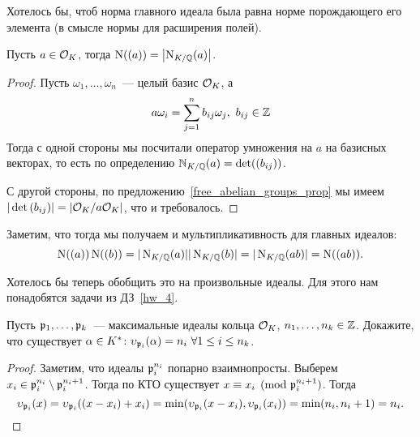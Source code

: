 	Хотелось бы, чтоб норма главного идеала была равна норме порождающего его элемента (в смысле нормы для расширения полей). 
	\begin{statement} 
		 Пусть $a \in \mathcal{O}_{K}$, тогда $\mathrm{N}((a)) = \left\lvert\mathrm{N}_{K/\mathbb{Q}}(a)\right\rvert$.
	\end{statement}
	\begin{proof}
		Пусть $\omega_{1}, \ldots, \omega_{n}$~--- целый базис $\mathcal{O}_{K}$, а 
		\[
			a \omega_{i} = \sum\limits_{j = 1}^{n} b_{i j} \omega_{j}, \ b_{i j} \in \mathbb{Z}	
		\]
		Тогда с одной стороны мы посчитали оператор умножения на $a$ на базисных векторах, то есть по определению $\mathbb{N}_{K/\mathbb{Q}}(a) = \det((b_{i j}))$. 

		 С другой стороны, по предложению~\ref{free_abelian_groups_prop} мы имеем $|\det{(b_{i j})}| = \left\lvert \mathcal{O}_{K}/a\mathcal{O}_{K} \right\rvert$, что и требовалось. 
	\end{proof}

	Заметим, что тогда мы получаем и мультипликативность для главных идеалов: 
	\[
		\operatorname{\mathrm{N}}((a))\operatorname{\mathrm{N}}((b)) = |\operatorname{\mathrm{N}}_{K/\mathbb{Q}}(a)||\operatorname{\mathrm{N}}_{K/\mathbb{Q}}(b)| = |\operatorname{\mathrm{N}}_{K/\mathbb{Q}}(ab)| = \operatorname{\mathrm{N}}((ab)).
	\]

	Хотелось бы теперь обобщить это на произвольные идеалы. Для этого нам понадобятся задачи из ДЗ~\ref{hw_4}. 

	\begin{lemma}\label{hw_4_task_3} 
		 Пусть $\mathfrak{p}_{1}, \ldots, \mathfrak{p}_{k}$~--- максимальные идеалы кольца $\mathcal{O}_{K}$, $n_{1}, \ldots, n_{k} \in \mathbb{Z}$. Докажите, что существует $\alpha \in K^{*}\colon \upsilon_{\mathfrak{p}_{i}}(\alpha) = n_{i} \ \forall 1 \le i \le n_{k}$.
	\end{lemma}
	\begin{proof}
		Заметим, что идеалы $\mathfrak{p}_{i}^{n_{i}}$ попарно взаимнопросты. Выберем $x_{i} \in \mathfrak{p}_{i}^{n_i} \setminus \mathfrak{p}_{i}^{n_i + 1}$. Тогда по КТО существует $x \equiv x_{i} \pmod{\mathfrak{p}_{i}^{n_{i} + 1}}$. Тогда 
		\[
			\upsilon_{\mathfrak{p}_{i}}(x) = \upsilon_{\mathfrak{p}_{i}}((x - x_{i}) + x_{i}) = \min(\upsilon_{\mathfrak{p}_{i}}(x - x_i), \upsilon_{\mathfrak{p}_i}(x_i)) = \min(n_i, n_i + 1) = n_{i}.
		\]
	\end{proof}

